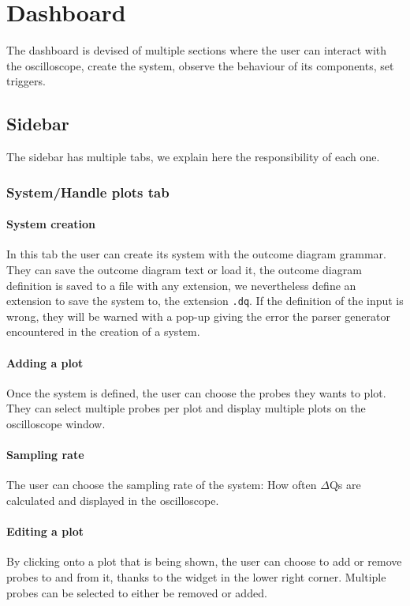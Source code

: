 \section{Dashboard}
    The dashboard is devised of multiple sections where the user can interact with the oscilloscope, create the system, observe the behaviour of its components, set triggers.

    \subsection{Sidebar}
        The sidebar has multiple tabs, we explain here the responsibility of each one.

    \subsubsection{System/Handle plots tab}

    \paragraph{System creation}
        In this tab the user can create its system with the outcome diagram grammar. They can save the outcome diagram text or load it, the outcome diagram definition is saved to a file with any extension, we nevertheless define an extension to save the system to, the extension \texttt{.dq}.
        If the definition of the input is wrong, they will be warned with a pop-up giving the error the parser generator encountered in the creation of a system.

    \paragraph{Adding a plot}
        Once the system is defined, the user can choose the probes they wants to plot. They can select multiple probes per plot and display multiple plots on the oscilloscope window.
    
    \paragraph{Sampling rate}
        The user can choose the sampling rate of the system: How often $\Delta$Qs are calculated and displayed in the oscilloscope.

    \paragraph{Editing a plot}
        By clicking onto a plot that is being shown, the user can choose to add or remove probes to and from it, thanks to the widget in the lower right corner. Multiple probes can be selected to either be removed or added.

